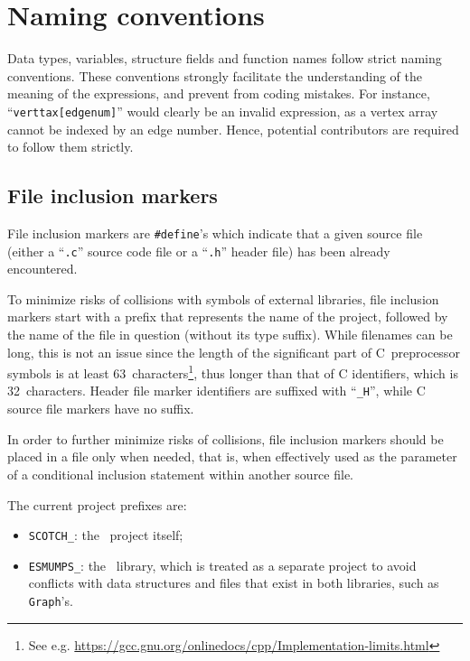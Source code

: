 \section{Naming conventions}
\label{sec-naming}

Data types, variables, structure fields and function names follow
strict naming conventions. These conventions strongly facilitate the
understanding of the meaning of the expressions, and prevent from
coding mistakes. For instance, ``\texttt{verttax[edgenum]}'' would
clearly be an invalid expression, as a vertex array cannot be indexed
by an edge number. Hence, potential contributors are required to
follow them strictly.

\subsection{File inclusion markers}
\label{sec-naming-file-inclusion-markers}

File inclusion markers are \texttt{\#define}'s which indicate that a
given source file (either a ``\texttt{.c}'' source code file or a
``\texttt{.h}'' header file) has been already encountered.

To minimize risks of collisions with symbols of external libraries,
file inclusion markers start with a prefix that represents the name of
the project, followed by the name of the file in question (without its
type suffix). While filenames can be long, this is not an issue since
the length of the significant part of C~preprocessor symbols is at
least 63~characters\footnote{See e.g.
\url{https://gcc.gnu.org/onlinedocs/cpp/Implementation-limits.html}},
thus longer than that of C identifiers, which is 32~characters.
Header file marker identifiers are suffixed with ``\texttt{\_H}'',
while C source file markers have no suffix.

In order to further minimize risks of collisions, file inclusion
markers should be placed in a file only when needed, that is, when
effectively used as the parameter of a conditional inclusion statement
within another source file.

The current project prefixes are:
\begin{itemize}
\item
  \texttt{SCOTCH\_}: the \scotch\ project itself;
\item
  \texttt{ESMUMPS\_}: the \esmumps\ library, which is treated as a
  separate project to avoid conflicts with data structures and files
  that exist in both libraries, such as \texttt{Graph}'s.
\end{itemize}

